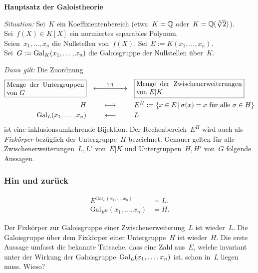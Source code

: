 \documentclass{../../algblatt}
\newcommand{\fmini}[2]{\framebox{\begin{minipage}{#1}#2\end{minipage}}}
\begin{document}
\begin{center}\Large \sffamily\textbf{Hauptsatz der Galoistheorie}\end{center}

\emph{Situation:} \tabto{1.85cm}
Sei~$K$ ein Koeffizientenbereich (etwa~$K = \mathbb{Q}$ oder~$K = \mathbb{Q}(\sqrt[3]{2})$).
\\
\tabto{1.85cm} Sei~$f(X) \in K[X]$ ein normiertes separables Polynom. \\
\tabto{1.85cm} Seien~$x_1,\ldots,x_n$ die Nullstellen von~$f(X)$.
Sei~$E := K(x_1,\ldots,x_n)$. \\
\tabto{1.85cm} Sei~$G := \mathrm{Gal}_K(x_1,\ldots,x_n)$ die Galoisgruppe der
Nullstellen über~$K$.

\emph{Dann gilt:} \tabto{1.85cm} Die Zuordnung
\[
  \begin{array}{@{}rcl@{}}
    \fmini{0.33\textwidth}{Menge der Untergruppen von~$G$}
    &\xleftrightarrow{\text{\qquad1:1\qquad}}&
    \fmini{0.45\textwidth}{Menge der Zwischenerweiterungen von~$E|K$} \\[1.3em]
    H &\longmapsto&
      E^H := \{ x \in E \,|\, \text{$\sigma(x) = x$ für alle~$\sigma \in H$} \} \\[0.3em]
    \mathrm{Gal}_L(x_1,\ldots,x_n) &\longmapsfrom& L
  \end{array}
\]
ist eine inklusionsumkehrende Bijektion. Der Rechenbereich~$E^H$ wird auch als
\emph{Fixkörper} bezüglich der Untergruppe~$H$ bezeichnet.
Genauer gelten für alle Zwischenerweiterungen~$L,L'$ von~$E|K$
und Untergruppen~$H,H'$ von~$G$ folgende Aussagen.


\subsubsection*{Hin und zurück}
\vspace{-1.5em}
\begin{align*}
  E^{\mathrm{Gal}_L(x_1,\ldots,x_n)} &= L. \\
  \mathrm{Gal}_{E^H}(x_1,\ldots,x_n) &= H.
\end{align*}

Der Fixkörper zur Galoisgruppe einer Zwischenerweiterung~$L$
ist wieder~$L$. Die Galoisgruppe über dem Fixkörper einer Untergruppe~$H$ ist
wieder~$H$.
Die erste Aussage umfasst die bekannte Tatsache, dass eine
Zahl aus~$E$, welche invariant unter der Wirkung der
Galoisgruppe~$\mathrm{Gal}_L(x_1,\ldots,x_n)$ ist, schon in~$L$ liegen muss. Wieso?
\end{document}
